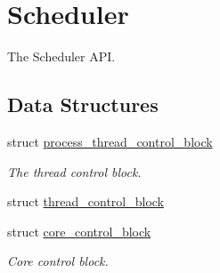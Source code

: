 \hypertarget{group__scheduler}{}\section{Scheduler}
\label{group__scheduler}


The Scheduler A\+PI.  


\subsection*{Data Structures}
\begin{DoxyCompactItemize}
\item 
struct \hyperlink{structprocess__thread__control__block}{process\+\_\+thread\+\_\+control\+\_\+block}
\begin{DoxyCompactList}\small\item\em The thread control block. \end{DoxyCompactList}\item 
struct \hyperlink{structthread__control__block}{thread\+\_\+control\+\_\+block}
\item 
struct \hyperlink{structcore__control__block}{core\+\_\+control\+\_\+block}
\begin{DoxyCompactList}\small\item\em Core control block. \end{DoxyCompactList}\end{DoxyCompactItemize}
